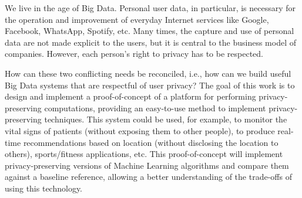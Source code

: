 We live in the age of Big Data. Personal user data, in particular, is necessary for the operation and improvement of everyday Internet services like Google, Facebook, WhatsApp, Spotify, etc. Many times, the capture and use of personal data are not made explicit to the users, but it is central to the business model of companies. However, each person’s right to privacy has to be respected.

How can these two conflicting needs be reconciled, i.e., how can we build useful Big Data systems that are respectful of user privacy?
The goal of this work is to design and implement a proof-of-concept of a platform for performing privacy-preserving computations, providing an easy-to-use method to implement privacy-preserving techniques. This system could be used, for example, to monitor the vital signs of patients (without exposing them to other people), to produce real-time recommendations based on location (without disclosing the location to others), sports/fitness applications, etc.
This proof-of-concept will implement privacy-preserving versions of Machine Learning algorithms and compare them against a baseline reference, allowing a better understanding of the trade-offs of using this technology.

\newpage
